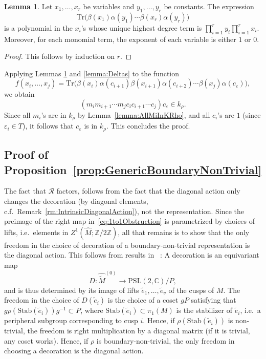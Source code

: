 \documentclass[12pt]{amsart}
\theoremstyle{definition}
\newtheorem{lemma}[theorem]{Lemma}
\numberwithin{equation}{section}
\def\PSL{\mathrm{PSL}}
\def\Z{\mathbb{Z}}
\def\C{\mathbb{C}}
\def\Tr{\mathrm{Tr}}
\def\Stab{\mathrm{Stab}}
\begin{document}
\begin{lemma}\label{lemma:TraceFormula} Let $x_1,\dots,x_r$ be variables and $y_1,\dots,y_r$ be constants.
The expression
\begin{equation}
\Tr\big(\beta(x_1)\alpha(y_1)\cdots\beta(x_r)\alpha(y_r)\big)
\end{equation}
is a polynomial in the $x_i$'s whose unique highest degree term is $\prod_{i=1}^ry_i\prod_{i=1}^rx_i$. Moreover, for each monomial term, the exponent of each variable is either $1$ or $0$.
\end{lemma}
\begin{proof}
This follows by induction on $r$.
\end{proof}

Applying Lemmas \ref{lemma:TraceFormula} and \ref{lemma:Deltas} to the function
\begin{equation}
f(x_i,\dots,x_j)=\Tr\big(\beta(x_i)\alpha(c_{i+1})\beta(x_{i+1})\alpha(c_{i+2})\cdots \beta(x_j)\alpha(c_\varepsilon)\big),
\end{equation} 
we obtain 
\begin{equation}
(m_im_{i+1}\cdots m_jc_ic_{i+1}\cdots c_j)c_\varepsilon\in k_\rho.
\end{equation}
Since all $m_i$'s are in $k_\rho$ by Lemma~\ref{lemma:AllMiInKRho}, and all $c_i$'s are $1$ (since $\varepsilon_i\in T$), it follows that $c_\varepsilon$ is in $k_\rho$. This concludes the proof. 


\subsection{Proof of Proposition~\ref{prop:GenericBoundaryNonTrivial}}\label{sec:PtolemyToRepProof}
The fact that $\mathcal R$ factors, follows from the fact that the diagonal action only changes the decoration (by diagonal elements, c.f.~Remark~\ref{rm:IntrinsicDiagonalAction}), not the representation.
Since the preimage of the right map in~\eqref{eq:1to1Obstruction} is parametrized by choices of lifts, i.e.~elements in $Z^1(\widehat M;\Z/2\Z)$, all that remains is to show that the only freedom in the choice of decoration of a boundary-non-trivial representation is the diagonal action. 
This follows from results in ~\cite{GaroufalidisThurstonZickert}: A decoration is an equivariant map
\begin{equation}
D\colon \widehat{\widetilde{M}}^{(0)}\to \PSL(2,\C)\big/P,
\end{equation}
and is thus determined by its image of lifts $\widetilde e_1,\dots,\widetilde e_v$ of the cusps of $M$. The freedom in the choice of $D(\widetilde e_i)$ is the choice of a coset $gP$ satisfying that $g\rho(\Stab(\widetilde e_i))g^{-1}\subset P$, where $\Stab(\widetilde e_i)\subset\pi_1(M)$ is the stabilizer of $\widetilde e_i$, i.e.~a peripheral subgroup corresponding to cusp $i$. Hence, if $\rho(\Stab(\widetilde e_i))$ is non-trivial, the freedom is right multiplication by a diagonal matrix (if it is trivial, any coset works). Hence, if $\rho$ is boundary-non-trivial, the only freedom in choosing a decoration is the diagonal action. 
\end{document}
